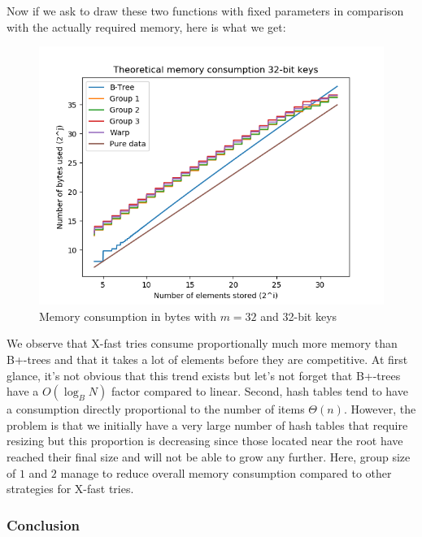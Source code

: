 

Now if we ask to draw these two functions with fixed parameters in comparison with the actually required memory, here is what we get:

\begin{figure}[!ht]
\centering
\includegraphics[width=0.925\linewidth]{Chapters/XFastTries/Implementation/MemoryConsumption32.png} 
\caption{Memory consumption in bytes with $m = 32$ and 32-bit keys}
\end{figure}

We observe that X-fast tries consume proportionally much more memory than B+-trees and that it takes a lot of elements before they are competitive. At first glance, it's not obvious that this trend exists but let's not forget that B+-trees have a $O(\log_{B}N)$ factor compared to linear. Second, hash tables tend to have a consumption directly proportional to the number of items $\Theta(n)$. However, the problem is that we initially have a very large number of hash tables that require resizing but this proportion is decreasing since those located near the root have reached their final size and will not be able to grow any further. Here, group size of $1$ and $2$ manage to reduce overall memory consumption compared to other strategies for X-fast tries.

\subsubsection{Conclusion}

